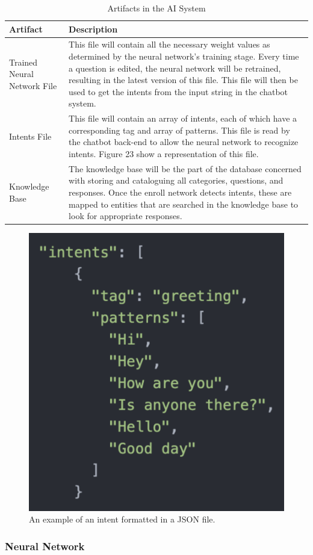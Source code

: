 \documentclass[titlepage, 12pt]{article}
\begin{document}
\begin{center}
\begin{table}[h]
\caption{Artifacts in the AI System}
    \centering
    \begin{tabular}{ L{3cm} L{9cm} }
        \toprule
        \textbf{Artifact} & \textbf{Description}
        \tabularnewline
        \midrule
        Trained Neural Network File & This file will contain all the necessary weight values as determined by the neural network’s training stage. Every time a question is edited, the neural network will be retrained, resulting in the latest version of this file. This file will then be used to get the intents from the input string in the chatbot system.
        \tabularnewline
        \midrule 
        Intents File & This file will contain an array of intents, each of which have a corresponding tag and array of patterns. This file is read by the chatbot back-end to allow the neural network to recognize intents. Figure 23 show a representation of this file.
        \tabularnewline
        \midrule
        Knowledge Base & The knowledge base will be the part of the database concerned with storing and cataloguing all categories, questions, and responses. Once the enroll network detects intents, these are mapped to entities that are searched in the knowledge base to look for appropriate responses.
        \tabularnewline
        \bottomrule
    \end{tabular}
\end{table}
\end{center}


\begin{figure}[h!]
    \centering\includegraphics[width=0.5\linewidth]{images/json.png}
    \caption{An example of an intent formatted in a JSON file.}
\end{figure}

\subsubsection{Neural Network}
\end{document}
